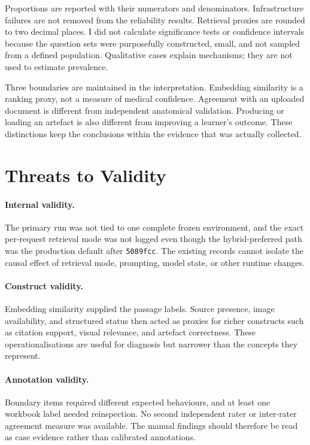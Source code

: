 Proportions are reported with their numerators and denominators. Infrastructure failures are not removed from the reliability results. Retrieval proxies are rounded to two decimal places. I did not calculate significance tests or confidence intervals because the question sets were purposefully constructed, small, and not sampled from a defined population. Qualitative cases explain mechanisms; they are not used to estimate prevalence.

Three boundaries are maintained in the interpretation. Embedding similarity is a ranking proxy, not a measure of medical confidence. Agreement with an uploaded document is different from independent anatomical validation. Producing or loading an artefact is also different from improving a learner's outcome. These distinctions keep the conclusions within the evidence that was actually collected.

\section{Threats to Validity}
\label{sec:evaluation-threats}

\paragraph{Internal validity.}
The primary run was not tied to one complete frozen environment, and the exact per-request retrieval mode was not logged even though the hybrid-preferred path was the production default after \texttt{5089fcc}. The existing records cannot isolate the causal effect of retrieval mode, prompting, model state, or other runtime changes.

\paragraph{Construct validity.}
Embedding similarity supplied the passage labels. Source presence, image availability, and structured status then acted as proxies for richer constructs such as citation support, visual relevance, and artefact correctness. These operationalisations are useful for diagnosis but narrower than the concepts they represent.

\paragraph{Annotation validity.}
Boundary items required different expected behaviours, and at least one workbook label needed reinspection. No second independent rater or inter-rater agreement measure was available. The manual findings should therefore be read as case evidence rather than calibrated annotations.


